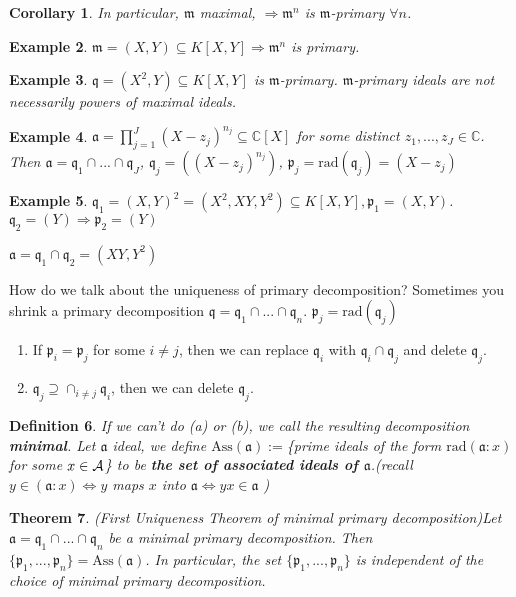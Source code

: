 \documentclass[11pt]{article}
\newtheorem{thm}{Theorem}[section]
\newtheorem{cor}[thm]{Corollary}
\newtheorem{dfn}[thm]{Definition}
\newtheorem{ex}[thm]{Example}
\newcommand{\cplx}{\mathbb C}
\newcommand{\sca}{{\mathfrak a}}
\newcommand{\scm}{{\mathfrak m}}
\newcommand{\scp}{{\mathfrak p}}
\newcommand{\scq}{\mathfrak q}
\newcommand{\cala}{{\cal A}}
\newcommand{\Lrta}{\Longrightarrow}
\newcommand{\Llrta}{\Longleftrightarrow}
\begin{document}
\begin{cor}In particular, 
$\scm$ maximal, $\Lrta\scm^n$ is $\scm$-primary $\forall n$.
\end{cor}
\begin{ex}
$\scm=(X,Y)\subseteq K[X,Y]\Lrta \scm^n$ is primary.
\end{ex}
\begin{ex}
$\scq=(X^2,Y)\subseteq K[X,Y]$ is $\scm$-primary. $\scm$-primary ideals are not necessarily powers of maximal ideals.
\end{ex}
\begin{ex}
$\sca=\prod^J_{j=1}(X-z_j)^{n_j}\subseteq \cplx[X]$ for some distinct $z_1,...,z_J\in\cplx$. Then $\sca=\scq_1\cap...\cap\scq_J$, $\scq_j=((X-z_j)^{n_j})$, $\scp_j=\text{rad}(\scq_j)=(X-z_j)$ 
\end{ex}
\begin{ex}
$\scq_1=(X,Y)^2=(X^2,XY,Y^2)\subseteq K[X,Y],\scp_1=(X,Y)$. $\scq_2=(Y)\Lrta \scp_2=(Y)$

$\sca=\scq_1\cap\scq_2=(XY,Y^2)$
\end{ex}

How do we talk about the uniqueness of primary decomposition?
Sometimes you shrink a primary decomposition $\scq=\scq_1\cap...\cap\scq_n$. $\scp_j=\text{rad}(\scq_j)$ 
\begin{enumerate}[label=(\alph*)]
\item If $\scp_i=\scp_j$ for some $i\neq j$, then we can replace $\scq_i$ with $\scq_i\cap\scq_j$ and delete $\scq_j$.
\item $\scq_j\supseteq \cap_{i\neq j}\scq_i$, then we can delete $\scq_j$.
\end{enumerate}
\begin{dfn}
If we can't do (a) or (b), we call the resulting decomposition \textbf{minimal}. Let $\sca$ ideal, we define $\text{Ass}(  \sca):=$\{prime ideals of the form $\text{rad}(\sca:x)$ for some $x\in\cala$\} to be \textbf{the set of associated ideals of $\sca$}.(recall $y\in(\sca:x)\Llrta y$ maps $x$ into $\sca\Llrta yx\in\sca$ )
\end{dfn}

\begin{thm}(First Uniqueness Theorem of minimal primary decomposition)\label{thm:primary_decomposition_First_uniqueness}
Let $\sca=\scq_1\cap...\cap\scq_n$ be a minimal primary decomposition. Then $\{\scp_1,...,\scp_n\}=\text{Ass}(  \sca)$. In particular, the set $\{\scp_1,...,\scp_n\}$ is independent of the choice of minimal primary decomposition.
\end{thm}
\end{document}
